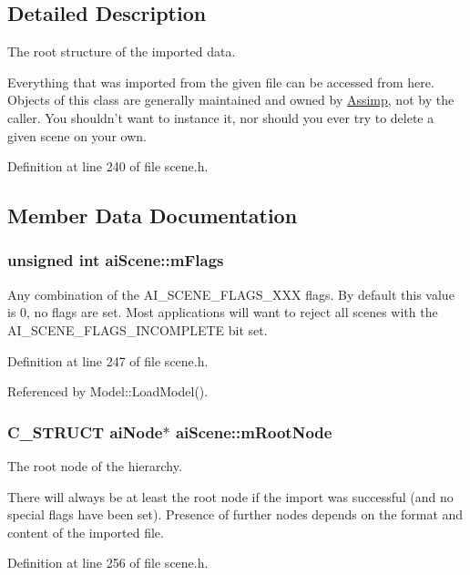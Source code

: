 \subsection{Detailed Description}
The root structure of the imported data.

Everything that was imported from the given file can be accessed from here. Objects of this class are generally maintained and owned by \hyperlink{namespace_assimp}{Assimp}, not by the caller. You shouldn't want to instance it, nor should you ever try to delete a given scene on your own. 

Definition at line 240 of file scene.h.

\subsection{Member Data Documentation}
\hypertarget{structai_scene_4091f10bb81e05db00ebc34f40c48f38}{
\subsubsection[mFlags]{\setlength{\rightskip}{0pt plus 5cm}unsigned int {\bf aiScene::mFlags}}}
\label{structai_scene_4091f10bb81e05db00ebc34f40c48f38}


Any combination of the AI\_\-SCENE\_\-FLAGS\_\-XXX flags. By default this value is 0, no flags are set. Most applications will want to reject all scenes with the AI\_\-SCENE\_\-FLAGS\_\-INCOMPLETE bit set. 

Definition at line 247 of file scene.h.

Referenced by Model::LoadModel().\hypertarget{structai_scene_d0e9a7e68f2ed6b3120a7c19ef20307a}{
\subsubsection[mRootNode]{\setlength{\rightskip}{0pt plus 5cm}C\_\-STRUCT {\bf aiNode}$\ast$ {\bf aiScene::mRootNode}}}
\label{structai_scene_d0e9a7e68f2ed6b3120a7c19ef20307a}


The root node of the hierarchy.

There will always be at least the root node if the import was successful (and no special flags have been set). Presence of further nodes depends on the format and content of the imported file. 

Definition at line 256 of file scene.h.

